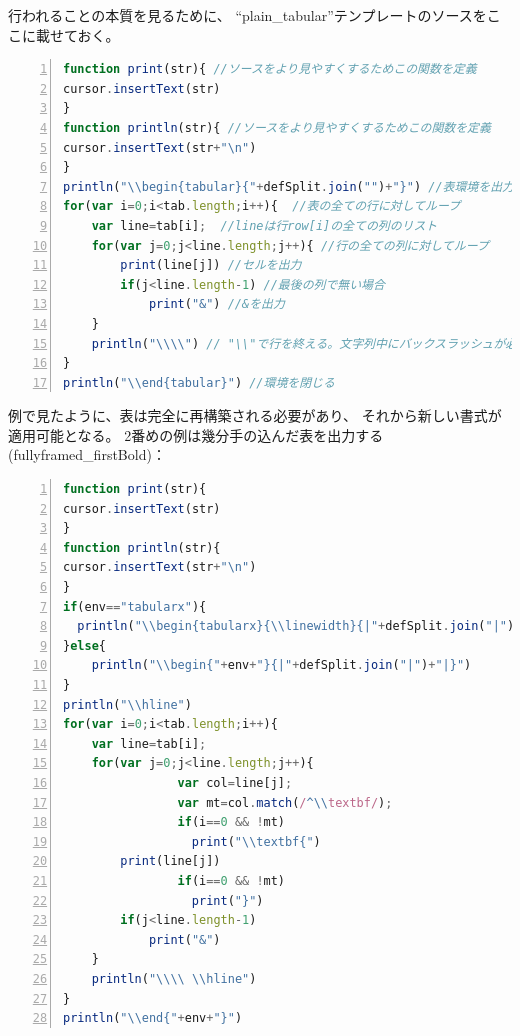 行われることの本質を見るために、
``plain\_tabular''テンプレートのソースをここに載せておく。

\begin{lstlisting}[frame=single,language=JavaScript,breaklines=true,numbers=left]
function print(str){ //ソースをより見やすくするためこの関数を定義
cursor.insertText(str)
}
function println(str){ //ソースをより見やすくするためこの関数を定義
cursor.insertText(str+"\n")
}
println("\\begin{tabular}{"+defSplit.join("")+"}") //表環境を出力
for(var i=0;i<tab.length;i++){  //表の全ての行に対してループ
    var line=tab[i];  //lineは行row[i]の全ての列のリスト
    for(var j=0;j<line.length;j++){ //行の全ての列に対してループ
        print(line[j]) //セルを出力
        if(j<line.length-1) //最後の列で無い場合
            print("&") //&を出力
    }
    println("\\\\") // "\\"で行を終える。文字列中にバックスラッシュが必要なことに注意。
}
println("\\end{tabular}") //環境を閉じる
\end{lstlisting}

例で見たように、表は完全に再構築される必要があり、
それから新しい書式が適用可能となる。
2番めの例は幾分手の込んだ表を出力する(fullyframed\_firstBold)：

\begin{lstlisting}[frame=single,language=JavaScript,breaklines=true,numbers=left]
function print(str){
cursor.insertText(str)
}
function println(str){
cursor.insertText(str+"\n")
}
if(env=="tabularx"){
  println("\\begin{tabularx}{\\linewidth}{|"+defSplit.join("|")+"|}")
}else{
    println("\\begin{"+env+"}{|"+defSplit.join("|")+"|}")
}
println("\\hline")
for(var i=0;i<tab.length;i++){
    var line=tab[i];
    for(var j=0;j<line.length;j++){
                var col=line[j];
                var mt=col.match(/^\\textbf/);
                if(i==0 && !mt)
                  print("\\textbf{")
        print(line[j])
                if(i==0 && !mt)
                  print("}")
        if(j<line.length-1)
            print("&")
    }
    println("\\\\ \\hline")
}
println("\\end{"+env+"}")
\end{lstlisting}

